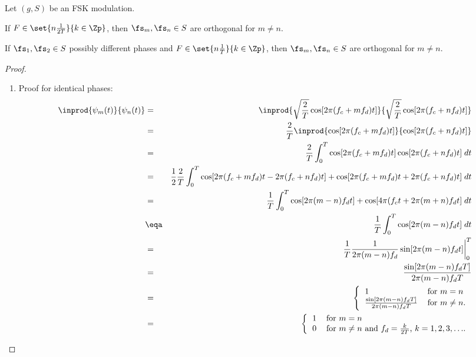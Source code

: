 \begin{theorem}
Let $(g,S)$ be an FSK modulation.
\begin{enume}
  \item If $F\in\set{n\frac{1}{2T}}{k\in\Zp}$, 
        then $\fs_m,\fs_n\in S$ are orthogonal for $m\not=n$.
  \item If $\fs_1,\fs_2\in S$ possibly different phases and
        $F\in\set{n\frac{1}{T}}{k\in\Zp}$, 
        then $\fs_m,\fs_n\in S$ are orthogonal for $m\not=n$.
\end{enume}
\end{theorem}
\begin{proof}

\begin{enumerate}
  \item Proof for identical phases:
\begin{eqnarray*}
   \inprod{\psi_m(t)}{\psi_n(t)}
     &=&   \inprod{\sqrt{\frac{2}{T}}\cos[2\pi (f_c+mf_d)t]}
                  {\sqrt{\frac{2}{T}}\cos[2\pi (f_c+nf_d)t]}
   \\&=&   \frac{2}{T}\inprod{\cos[2\pi (f_c+mf_d)t]}{\cos[2\pi (f_c+nf_d)t]}
   \\&=&   \frac{2}{T}\int_0^T \cos[2\pi (f_c+mf_d)t] \cos[2\pi (f_c+nf_d)t] \; dt
   \\&=&   \frac{1}{2}\frac{2}{T}\int_0^T \cos[2\pi(f_c+mf_d)t-2\pi(f_c+nf_d)t]+  \cos[2\pi(f_c+mf_d)t+2\pi(f_c+nf_d)t] \; dt
   \\&=&   \frac{1}{T}\int_0^T \cos[2\pi(m-n)f_dt] + \cos[4\pi(f_ct+2\pi(m+n)f_dt] \; dt
   \\&\eqa& \frac{1}{T}\int_0^T \cos[2\pi(m-n)f_dt]  \; dt
   \\&=&   \left.\frac{1}{T} \frac{1}{2\pi(m-n)f_d} \sin[2\pi(m-n)f_dt] \right|_0^T
   \\&=&   \frac{\sin[2\pi(m-n)f_dT]}{2\pi(m-n)f_d T} 
   \\&=&   \left\{
           \begin{tabular}{ll}
              $1$                                           & for $m=n$ \\
              $\frac{\sin[2\pi(m-n)f_dT]}{2\pi(m-n)f_d T}$  & for $m\ne n$.
           \end{tabular}
           \right.
   \\&=&   \left\{
           \begin{tabular}{ll}
              $1$                                           & for $m=n$ \\
              $0$  &       for $m\ne n$ and $f_d=\frac{k}{2T}$, $k=1,2,3,\ldots$.
           \end{tabular}
           \right.
\end{eqnarray*}


\end{enumerate}
\end{proof}
